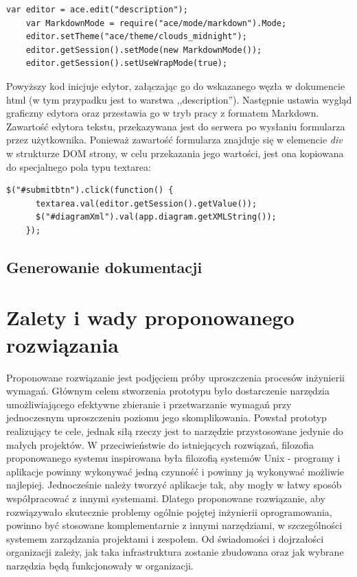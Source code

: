     \begin{lstlisting}[caption={Inicjalizacja edytora tekstu}, label={lst:colorUC}]
    var editor = ace.edit("description");
    var MarkdownMode = require("ace/mode/markdown").Mode;
    editor.setTheme("ace/theme/clouds_midnight");
    editor.getSession().setMode(new MarkdownMode());
    editor.getSession().setUseWrapMode(true);
    \end{lstlisting}

    Powyższy kod inicjuje edytor, załączając go do wskazanego węzła w dokumencie html (w tym przypadku jest to warstwa ,,description''). Następnie ustawia wygląd graficzny edytora oraz przestawia go w tryb pracy z formatem Markdown.
    Zawartość edytora tekstu, przekazywana jest do serwera po wysłaniu formularza przez użytkownika. Ponieważ zawartość formularza znajduje się w elemencie \emph{div} w strukturze DOM strony, w celu przekazania jego wartości, jest ona kopiowana do specjalnego pola typu textarea:

    \begin{lstlisting}[caption={Inicjalizacja edytora tekstu}, label={lst:colorUC}]
    $("#submitbtn").click(function() {
      textarea.val(editor.getSession().getValue()); 
      $("#diagramXml").val(app.diagram.getXMLString());
    });
    \end{lstlisting} 

    \subsection{Generowanie dokumentacji}

  \section{Zalety i wady proponowanego rozwiązania}
    Proponowane rozwiązanie jest podjęciem próby uproszczenia procesów inżynierii wymagań. Głównym celem stworzenia prototypu było dostarczenie narzędzia umożliwiającego efektywne zbieranie i przetwarzanie wymagań przy jednoczesnym uproszczeniu poziomu jego skomplikowania. Powstał prototyp realizujący te cele, jednak siłą rzeczy jest to narzędzie przystosowane jedynie do małych projektów. W przeciwieństwie do istniejących rozwiązań, filozofia proponowanego systemu inspirowana była filozofią systemów Unix - programy i aplikacje powinny wykonywać jedną czynność i powinny ją wykonywać możliwie najlepiej. Jednocześnie należy tworzyć aplikacje tak, aby mogły w łatwy sposób współpracować z innymi systemami. Dlatego proponowane rozwiązanie, aby rozwiązywało skutecznie problemy ogólnie pojętej inżynierii oprogramowania, powinno być stosowane komplementarnie z innymi narzędziami, w szczególności systemem zarządzania projektami i zespołem. Od świadomości i dojrzałości organizacji zależy, jak taka infrastruktura zostanie zbudowana oraz jak wybrane narzędzia będą funkcjonowały w organizacji.

